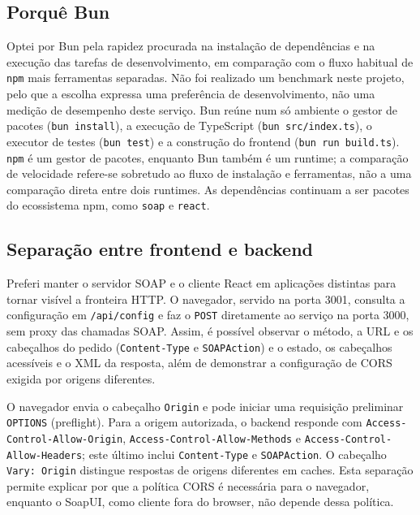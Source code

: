 \documentclass[11pt,a4paper]{article}
\begin{document}
\subsection{Porquê Bun}
Optei por Bun pela rapidez procurada na instalação de dependências e na execução das tarefas de desenvolvimento, em comparação com o fluxo habitual de \texttt{npm} mais ferramentas separadas. Não foi realizado um benchmark neste projeto, pelo que a escolha expressa uma preferência de desenvolvimento, não uma medição de desempenho deste serviço. Bun reúne num só ambiente o gestor de pacotes (\texttt{bun install}), a execução de TypeScript (\texttt{bun src/index.ts}), o executor de testes (\texttt{bun test}) e a construção do frontend (\texttt{bun run build.ts}). \texttt{npm} é um gestor de pacotes, enquanto Bun também é um runtime; a comparação de velocidade refere-se sobretudo ao fluxo de instalação e ferramentas, não a uma comparação direta entre dois runtimes. As dependências continuam a ser pacotes do ecossistema npm, como \texttt{soap} e \texttt{react}.

\subsection{Separação entre frontend e backend}
Preferi manter o servidor SOAP e o cliente React em aplicações distintas para tornar visível a fronteira HTTP. O navegador, servido na porta 3001, consulta a configuração em \texttt{/api/config} e faz o \texttt{POST} diretamente ao serviço na porta 3000, sem proxy das chamadas SOAP. Assim, é possível observar o método, a URL e os cabeçalhos do pedido (\texttt{Content-Type} e \texttt{SOAPAction}) e o estado, os cabeçalhos acessíveis e o XML da resposta, além de demonstrar a configuração de CORS exigida por origens diferentes.

O navegador envia o cabeçalho \texttt{Origin} e pode iniciar uma requisição preliminar \texttt{OPTIONS} (preflight). Para a origem autorizada, o backend responde com \texttt{Access-Control-Allow-Origin}, \texttt{Access-Control-Allow-Methods} e \texttt{Access-Control-Allow-Headers}; este último inclui \texttt{Content-Type} e \texttt{SOAPAction}. O cabeçalho \texttt{Vary: Origin} distingue respostas de origens diferentes em caches. Esta separação permite explicar por que a política CORS é necessária para o navegador, enquanto o SoapUI, como cliente fora do browser, não depende dessa política.
\end{document}
